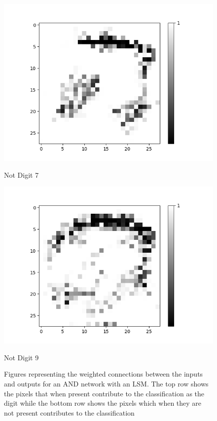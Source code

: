 \begin{figure}[H]
\begin{minipage}[b]{0.19\textwidth}
		\includegraphics[width=\textwidth]{AND(LSM)/Negative/Layer0-Neuron-7.png}
		\caption{Not Digit 7}
	\end{minipage}
	\begin{minipage}[b]{0.19\textwidth}
		\includegraphics[width=\textwidth]{AND(LSM)/Negative/Layer0-Neuron-9.png}
		\caption{Not Digit 9}
	\end{minipage}
	\hfill
	\caption{Figures representing the weighted connections between the inputs and outputs for an AND network with an LSM. The top row shows the pixels that when present contribute to the classification as the digit while the bottom row shows the pixels which when they are not present contributes to the classification}
\end{figure}

